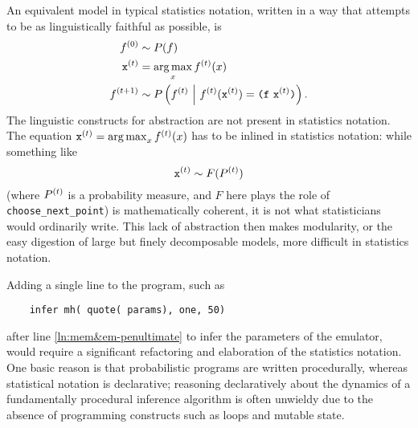 An equivalent model in typical statistics notation, written in a way that
attempts to be as linguistically faithful as possible, is
\begin{align*}
  \s{0}f &\sim P(f) \\
  \s{t}\xtt &= \argmax_x \s{t}f(x) \\
  \s{t+1}f &\sim P\pn{\s{t}f \mvert \s{t}f(\s{t}\xtt) = \texttt(\ftt\ \s{t}\xtt\texttt)}.
\end{align*}
The linguistic constructs for abstraction are not present in
statistics notation.  The equation $\s{t}\xtt = \argmax_x \s{t}f(x)$
has to be inlined in statistics notation: while something like
\[ \s{t}\xtt \sim F(\s{t}P) \]
(where $\s{t}P$ is a probability measure, and $F$ here plays the role of
\texttt{choose\_next\_point}) is mathematically coherent, it is not what
statisticians would ordinarily write.  This lack of abstraction then makes
modularity, or the easy digestion of large but finely decomposable models,
more difficult in statistics notation.

Adding a single line to the program, such as
    \begin{lstlisting}
    infer mh( quote( params), one, 50)
    \end{lstlisting}
after line \ref{ln:mem&em-penultimate} to infer the parameters of the
emulator, would require a significant refactoring and elaboration of the statistics
notation.  One basic reason is that probabilistic programs are written
procedurally, whereas statistical notation is declarative; reasoning
declaratively about the dynamics of a fundamentally procedural inference
algorithm is often unwieldy due to the absence of programming constructs
such as loops and mutable state.

